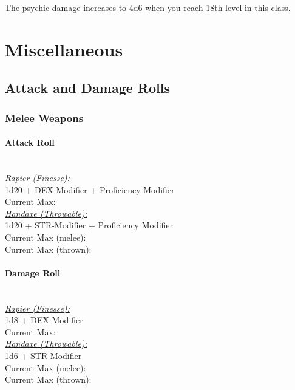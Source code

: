 \documentclass[letterpaper,openany,oneside,twocolumn]{book}
\begin{document}
The psychic damage increases to 4d6 when you reach 18th level in this class.

\vfill\eject

\section*{Miscellaneous}
\subsection*{Attack and Damage Rolls}
\subsubsection*{Melee Weapons}
\paragraph*{Attack Roll}\hfill\\
\underline{\textit{Rapier (Finesse):}}\\
1d20 + DEX-Modifier + Proficiency Modifier\\
\indent Current Max: 
\\
\underline{\textit{Handaxe (Throwable):}}\\
1d20 + STR-Modifier + Proficiency Modifier\\
\indent Current Max (melee): \\
\indent Current Max (thrown): 
\paragraph*{Damage Roll}\hfill\\
\underline{\textit{Rapier (Finesse):}}\\
1d8 + DEX-Modifier\\
\indent Current Max: 
\\
\underline{\textit{Handaxe (Throwable):}}\\
1d6 + STR-Modifier\\
\indent Current Max (melee): \\
\indent Current Max (thrown): 
\end{document}
